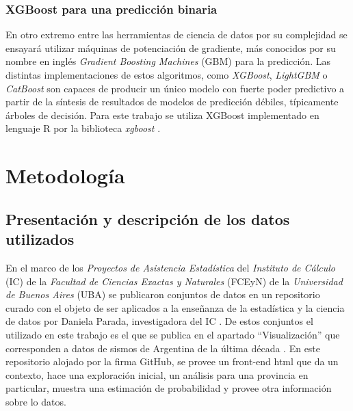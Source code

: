 \documentclass[a4paper]{report}
\begin{document}
\subsection{XGBoost para una predicción binaria}

En otro extremo entre las herramientas de ciencia de datos por su complejidad se ensayará utilizar máquinas de potenciación de gradiente, más conocidos por su nombre en inglés \emph{Gradient Boosting Machines} (GBM) para la predicción.
Las distintas implementaciones de estos algoritmos, como \emph{XGBoost}, \emph{LightGBM} o \emph{CatBoost} son capaces de producir un único modelo con fuerte poder predictivo a partir de la síntesis de resultados de modelos de predicción débiles, típicamente árboles de decisión. 
Para este trabajo se utiliza XGBoost implementado en lenguaje R por la biblioteca \emph{xgboost} \cite{chen_xgboost_2024}.






\chapter{Metodología}

\section{Presentación y descripción de los datos utilizados}

En el marco de los \emph{Proyectos de Asistencia Estadística} del \emph{Instituto de Cálculo} (IC) de la \emph{Facultad de Ciencias Exactas y Naturales} (FCEyN) de la \emph{Universidad de Buenos Aires} (UBA) se publicaron conjuntos de datos en un repositorio curado con el objeto de ser aplicados a la enseñanza de la estadística y la ciencia de datos por Daniela Parada, investigadora del IC \cite{noauthor_ic-datasets-docencia_nodate}.
De estos conjuntos el utilizado en este trabajo es el que se publica en el apartado ``Visualización'' que corresponden a datos de sismos de Argentina de la última década \cite{daniela_parada_ic-datasets-docencia_nodate}. 
En este repositorio alojado por la firma GitHub, se provee un front-end html que da un contexto, hace una exploración inicial, un análisis para una provincia en particular, muestra una estimación de probabilidad y provee otra información sobre lo datos.
\end{document}
